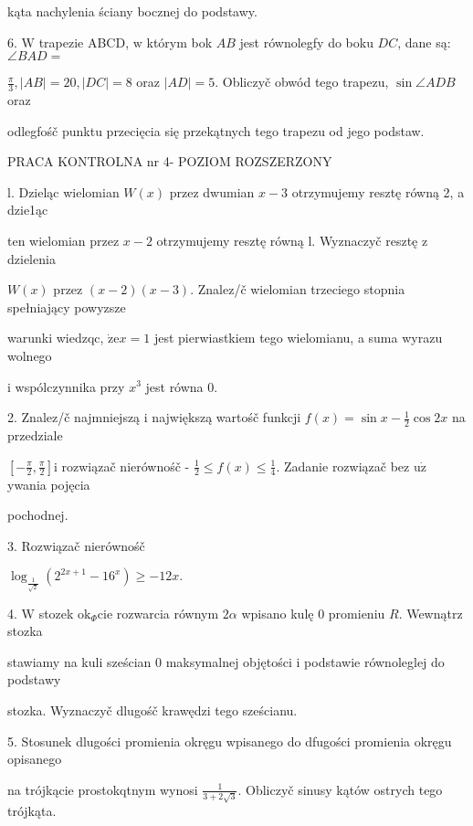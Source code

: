 \documentclass[a4paper,12pt]{article}
\begin{document}
kąta nachylenia ściany bocznej do podstawy.

6. $\mathrm{W}$ trapezie ABCD, $\mathrm{w}$ którym bok $AB$ jest równolegfy do boku $DC$, dane są: $\angle BAD=$

$\displaystyle \frac{\pi}{3}, |AB| =20, |DC| =8$ oraz $|AD| =5$. Obliczyč obwód tego trapezu, $\sin\angle ADB$ oraz

odlegfośč punktu przecięcia się przekątnych tego trapezu od jego podstaw.





PRACA KONTROLNA nr 4- POZIOM ROZSZERZONY

l. Dzieląc wielomian $W(x)$ przez dwumian $x-3$ otrzymujemy resztę równą 2, a dzie1ąc

ten wielomian przez $x-2$ otrzymujemy resztę równą l. Wyznaczyč resztę $\mathrm{z}$ dzielenia

$W(x)$ przez $(x-2)(x-3)$. Znalez/č wielomian trzeciego stopnia spełniający powyzsze

warunki wiedzqc, $\dot{\mathrm{z}}\mathrm{e}x=1$ jest pierwiastkiem tego wielomianu, a suma wyrazu wolnego

$\mathrm{i}$ wspólczynnika przy $x^{3}$ jest równa 0.

2. Znalez/č najmniejszą $\mathrm{i}$ największą wartośč funkcji $f(x)=\displaystyle \sin x-\frac{1}{2}\cos 2x$ na przedziale

$[-\displaystyle \frac{\pi}{2},\frac{\pi}{2}] \mathrm{i}$ rozwiązač nierównośč - $\displaystyle \frac{1}{2}\leq f(x)\leq\frac{1}{4}$. Zadanie rozwiązač bez $\mathrm{u}\dot{\mathrm{z}}$ ywania pojęcia

pochodnej.

3. Rozwiązač nierównośč

$\log_{\frac{1}{\sqrt{2}}}(2^{2x+1}-16^{x})\geq-12x.$

4. $\mathrm{W}$ stozek $\mathrm{o}\mathrm{k}_{\Phi}\mathrm{c}\mathrm{i}\mathrm{e}$ rozwarcia równym $ 2\alpha$ wpisano kulę $0$ promieniu $R$. Wewnątrz stozka

stawiamy na kuli sześcian $0$ maksymalnej objętości $\mathrm{i}$ podstawie równoleglej do podstawy

stozka. Wyznaczyč dlugośč krawędzi tego sześcianu.

5. Stosunek dlugości promienia okręgu wpisanego do dfugości promienia okręgu opisanego

na trójkącie prostokqtnym wynosi $\displaystyle \frac{1}{3+2\sqrt{3}}$. Obliczyč sinusy kątów ostrych tego trójkąta.
\end{document}
